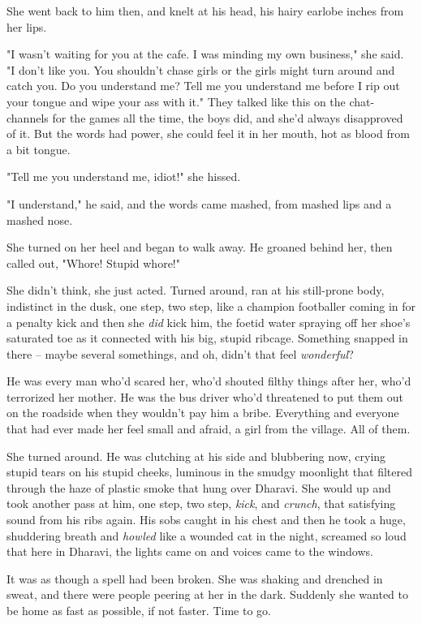 She went back to him then, and knelt at his head, his hairy earlobe
inches from her lips.

"I wasn't waiting for you at the cafe. I was minding my own
business," she said. "I don't like you. You shouldn't chase girls
or the girls might turn around and catch you. Do you understand me?
Tell me you understand me before I rip out your tongue and wipe
your ass with it." They talked like this on the chat-channels for
the games all the time, the boys did, and she'd always disapproved
of it. But the words had power, she could feel it in her mouth, hot
as blood from a bit tongue.

"Tell me you understand me, idiot!" she hissed.

"I understand," he said, and the words came mashed, from mashed
lips and a mashed nose.

She turned on her heel and began to walk away. He groaned behind
her, then called out, "Whore! Stupid whore!"

She didn't think, she just acted. Turned around, ran at his
still-prone body, indistinct in the dusk, one step, two step, like
a champion footballer coming in for a penalty kick and then she
\emph{did} kick him, the foetid water spraying off her shoe's
saturated toe as it connected with his big, stupid ribcage.
Something snapped in there -- maybe several somethings, and oh,
didn't that feel \emph{wonderful}?

He was every man who'd scared her, who'd shouted filthy things
after her, who'd terrorized her mother. He was the bus driver who'd
threatened to put them out on the roadside when they wouldn't pay
him a bribe. Everything and everyone that had ever made her feel
small and afraid, a girl from the village. All of them.

She turned around. He was clutching at his side and blubbering now,
crying stupid tears on his stupid cheeks, luminous in the smudgy
moonlight that filtered through the haze of plastic smoke that hung
over Dharavi. She would up and took another pass at him, one step,
two step, \emph{kick}, and \emph{crunch}, that satisfying sound
from his ribs again. His sobs caught in his chest and then he took
a huge, shuddering breath and \emph{howled} like a wounded cat in
the night, screamed so loud that here in Dharavi, the lights came
on and voices came to the windows.

It was as though a spell had been broken. She was shaking and
drenched in sweat, and there were people peering at her in the
dark. Suddenly she wanted to be home as fast as possible, if not
faster. Time to go.

